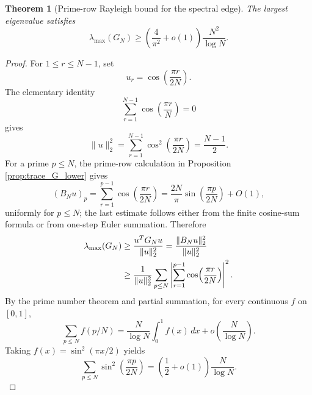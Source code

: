\documentclass[11pt]{amsart}
\numberwithin{equation}{section}
\theoremstyle{plain}
\newtheorem{theorem}{Theorem}[section]
\theoremstyle{definition}
\theoremstyle{remark}
\begin{document}
\begin{theorem}[Prime-row Rayleigh bound for the spectral edge]
\label{thm:prime_rayleigh_edge}
The largest eigenvalue satisfies
\begin{equation}
\lambda_{\max}(G_N)
\ge
\left(\frac{4}{\pi^2}+o(1)\right)\frac{N^2}{\log N}.
\label{eq:lambda_max_prime_rayleigh}
\end{equation}
\end{theorem}

\begin{proof}
For $1\le r\le N-1$, set
\begin{equation}
u_r=\cos\!\left(\frac{\pi r}{2N}\right).
\label{eq:cosine_test_vector}
\end{equation}
The elementary identity
\begin{equation}
\sum_{r=1}^{N-1}\cos\!\left(\frac{\pi r}{N}\right)=0
\end{equation}
gives
\begin{equation}
\|u\|_2^2
=\sum_{r=1}^{N-1}\cos^2\!\left(\frac{\pi r}{2N}\right)
=\frac{N-1}{2}.
\label{eq:cosine_test_norm}
\end{equation}
For a prime $p\le N$, the prime-row calculation in Proposition \ref{prop:trace_G_lower} gives
\begin{equation}
(B_Nu)_p
=\sum_{r=1}^{p-1}\cos\!\left(\frac{\pi r}{2N}\right)
=\frac{2N}{\pi}\sin\!\left(\frac{\pi p}{2N}\right)+O(1),
\label{eq:prime_row_cosine_sum}
\end{equation}
uniformly for $p\le N$; the last estimate follows either from the finite cosine-sum formula or from one-step Euler summation.  Therefore
\begin{align}
\lambda_{\max}(G_N)
&\ge \frac{u^TG_Nu}{\|u\|_2^2}
=\frac{\|B_Nu\|_2^2}{\|u\|_2^2}\notag\\
&\ge
\frac{1}{\|u\|_2^2}
\sum_{p\le N}
\left|\sum_{r=1}^{p-1}\cos\!\left(\frac{\pi r}{2N}\right)\right|^2.
\label{eq:prime_rayleigh_quotient}
\end{align}
By the prime number theorem and partial summation, for every continuous $f$ on $[0,1]$,
\begin{equation}
\sum_{p\le N}f(p/N)
=\frac{N}{\log N}\int_0^1f(x)\,dx
+o\!\left(\frac{N}{\log N}\right).
\label{eq:weighted_pnt_riemann}
\end{equation}
Taking $f(x)=\sin^2(\pi x/2)$ yields
\begin{equation}
\sum_{p\le N}\sin^2\!\left(\frac{\pi p}{2N}\right)
=\left(\frac12+o(1)\right)\frac{N}{\log N}.
\label{eq:prime_sine_square_sum}
\end{equation}

\end{proof}
\end{document}
